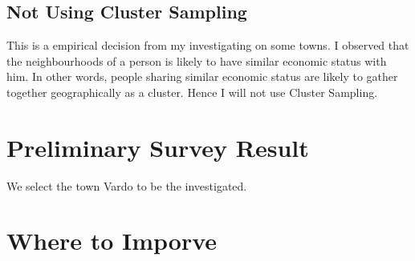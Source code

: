 \documentclass[12pt]{article}%
\begin{document}
\subsection{Not Using Cluster Sampling}
This is a empirical decision from my investigating on some towns. I observed that the neighbourhoods of a person is likely to have similar economic status with him.
In other words, people sharing similar economic status are likely to gather together geographically as a cluster. Hence I will not use Cluster Sampling.



\section{Preliminary Survey Result}

We select the town Vardo to be the investigated.

\section{Where to Imporve}
\end{document}
